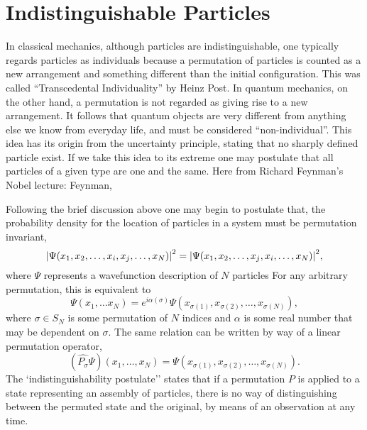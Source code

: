 \section{Indistinguishable Particles}

    In classical mechanics, although particles are indistinguishable, one typically
    regards particles as individuals because a permutation of particles is counted as
    a new arrangement and something different than the initial configuration. 
    This was called ``Transcedental
    Individuality'' by Heinz Post\cite{post1963individuality}. In quantum mechanics, on 
    the other hand, a permutation is not regarded as giving rise to a new 
    arrangement. It follows that quantum objects are very different from anything else we
    know from everyday life, and must be considered ``non-individual''. This 
    idea has its origin from the uncertainty principle, stating that no sharply defined 
    particle exist. If we take this idea
    to its extreme one may postulate that all particles of a given type are one and the
    same. Here from Richard Feynman's Nobel lecture:
    Feynman\cite{feynman1965nobel},

    Following the brief discussion above one may begin to postulate that, the probability density
    for the location of particles in a system must be permutation invariant,
    \begin{equation}
        \label{eq:square_wavefunction_pauli}
        \abs{\Psi(x_1, x_2, \dots, x_i, x_j, \dots, x_N)}^2 
        = 
        \abs{\Psi(x_1, x_2, \dots, x_j, x_i, \dots, x_N)}^2,
    \end{equation}
    where $\Psi$ represents a wavefunction description of $N$ particles 
    For any arbitrary permutation, this is equivalent to 
    \begin{equation}
        \Psi(x_1, \dots x_N) 
        =
        e^{i\alpha(\sigma)}\Psi(x_{\sigma(1)}, x_{\sigma(2)}, \dots, x_{\sigma(N)}),
    \end{equation}
    where $\sigma \in S_N$ is some permutation of $N$ indices and $\alpha$ is 
    some real number that may be dependent on $\sigma$.
    The same relation can be written by way of a linear permutation operator,
    \begin{equation}
        (\hat{P_\sigma}\Psi)(x_1, \dots, x_N)
        =
        \Psi(x_{\sigma(1)}, x_{\sigma(2)}, \dots, x_{\sigma(N)}).
    \end{equation}
    The `indistinguishability postulate'' states that if a permutation $P$ is applied 
    to a state representing an assembly of particles, there is no way of distinguishing
    between the permuted state and the original, by means of an observation at any time.

